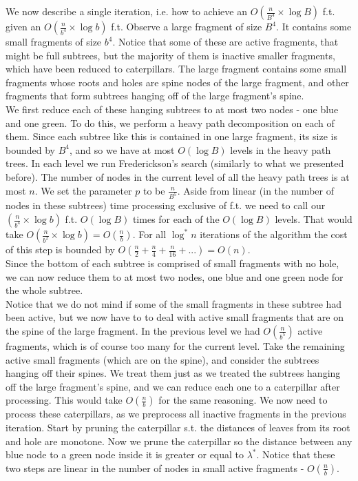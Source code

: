 \documentclass[11pt,a4paper]{article}
\theoremstyle{definition}
\theoremstyle{remark}
\begin{document}
We now describe a single iteration, i.e. how to achieve an $O(\frac{n}{B^4} \times \log B)$ f.t. given an $O(\frac{n}{b^4} \times \log b)$ f.t.
Observe a large fragment of size $B^4$. It contains some small fragments of size $b^4$. Notice that some of these are active fragments, that might be full subtrees, but the majority of them is inactive smaller fragments, which have been reduced to caterpillars. The large fragment contains some small fragments whose roots and holes are spine nodes of the large fragment, and other fragments that form subtrees hanging off of the large fragment's spine.\\ %

We first reduce each of these hanging subtrees to at most two nodes - one blue and one green. To do this, we perform a heavy path decomposition on each of them. Since each subtree like this is contained in one large fragment, its size is bounded by $B^4$, and so we have at most $O(\log B)$ levels in the heavy path trees. In each level we run Frederickson's search (similarly to what we presented before). The number of nodes in the current level of all the heavy path trees is at most $n$. We set the parameter $p$ to be $\frac{n}{B^5}$. Aside from linear (in the number of nodes in these subtrees) time processing exclusive of f.t. we need to call our $(\frac{n}{b^4} \times \log b)$ f.t. $O(\log B)$ times for each of the $O(\log B)$ levels. That would take $O(\frac{n}{b^2} \times \log b) = O(\frac{n}{b})$. For all $\log ^*n$ iterations of the algorithm the cost of this step is bounded by $O(\frac{n}{2}+\frac{n}{4}+\frac{n}{16}+...) = O(n)$.\\
Since the bottom of each subtree is comprised of small fragments with no hole, we can now reduce them to at most two nodes, one blue and one green node for the whole subtree.\\
Notice that we do not mind if some of the small fragments in these subtree had been active, but we now have to to deal with active small fragments  that are on the spine of the large fragment. In the previous level we had $O(\frac{n}{b^5})$ active fragments, which is of course too many for the current level. Take the remaining active small fragments (which are on the spine), and consider the subtrees hanging off their spines. We treat them just as we treated the subtrees hanging off the large fragment's spine, and we can reduce each one to a caterpillar after processing. This would take $O(\frac{n}{b})$ for the same reasoning. We now need to process these caterpillars, as we preprocess all inactive fragments in the previous iteration. Start by pruning the caterpillar s.t. the distances of leaves from its root and hole are monotone. Now we prune the caterpillar so the distance between any blue node to a green node inside it is greater or equal to $\lambda^*$. Notice that these two steps are linear in the number of nodes in small active fragments - $O(\frac{n}{b})$.\\
\end{document}
